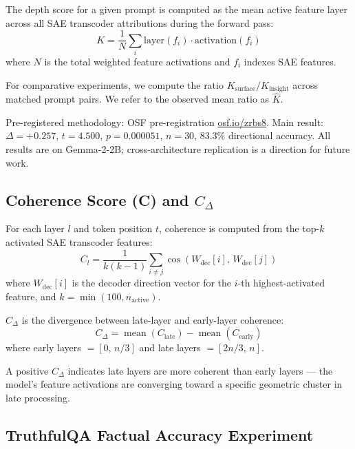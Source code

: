 \documentclass[10pt]{article}
\begin{document}
The depth score for a given prompt is computed as the mean active feature layer across all SAE transcoder attributions during the forward pass:
\begin{equation}
K = \frac{1}{N} \sum_{i} \text{layer}(f_i) \cdot \text{activation}(f_i)
\end{equation}
where $N$ is the total weighted feature activations and $f_i$ indexes SAE features.

For comparative experiments, we compute the ratio $K_{\text{surface}} / K_{\text{insight}}$ across matched prompt pairs. We refer to the observed mean ratio as $\hat{K}$.

Pre-registered methodology: OSF pre-registration \href{https://osf.io/zrbs8}{osf.io/zrbs8}. Main result: $\Delta = +0.257$, $t = 4.500$, $p = 0.000051$, $n = 30$, 83.3\% directional accuracy. All results are on Gemma-2-2B; cross-architecture replication is a direction for future work.

\subsection{Coherence Score (C) and $C_{\Delta}$}

For each layer $l$ and token position $t$, coherence is computed from the top-$k$ activated SAE transcoder features:
\begin{equation}
C_l = \frac{1}{k(k-1)} \sum_{i \neq j} \cos(W_{\text{dec}}[i],\, W_{\text{dec}}[j])
\end{equation}
where $W_{\text{dec}}[i]$ is the decoder direction vector for the $i$-th highest-activated feature, and $k = \min(100, n_{\text{active}})$.

\textbf{$C_{\Delta}$} is the divergence between late-layer and early-layer coherence:
\begin{equation}
C_{\Delta} = \operatorname{mean}(C_{\text{late}}) - \operatorname{mean}(C_{\text{early}})
\end{equation}
where early layers $= [0,\, n/3]$ and late layers $= [2n/3,\, n]$.

A positive $C_{\Delta}$ indicates late layers are more coherent than early layers --- the model's feature activations are converging toward a specific geometric cluster in late processing.

\subsection{TruthfulQA Factual Accuracy Experiment}
\end{document}
